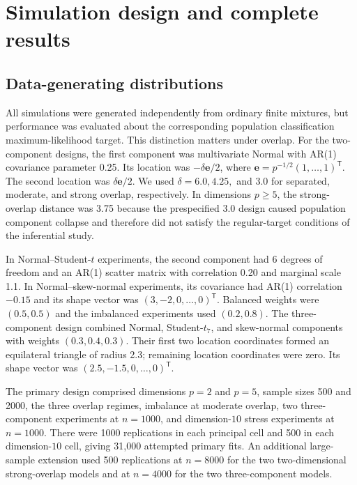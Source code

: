 \section{Simulation design and complete results}

\subsection{Data-generating distributions}

All simulations were generated independently from ordinary finite mixtures,
but performance was evaluated about the corresponding population
classification maximum-likelihood target.  This distinction matters under
overlap.  For the two-component designs, the first component was multivariate
Normal with AR(1) covariance parameter 0.25.  Its location was
$-\delta\mathbf{e}/2$, where
$\mathbf{e}=p^{-1/2}(1,\ldots,1)^\mathsf T$.  The second location was
$\delta\mathbf{e}/2$.  We used $\delta=6.0,4.25,$ and $3.0$ for separated,
moderate, and strong overlap, respectively.  In dimensions $p\geq5$, the
strong-overlap distance was 3.75 because the prespecified $3.0$ design caused
population component collapse and therefore did not satisfy the regular-target
conditions of the inferential study.

In Normal--Student-$t$ experiments, the second component had 6 degrees of
freedom and an AR(1) scatter matrix with correlation 0.20 and marginal scale
1.1.  In Normal--skew-normal experiments, its covariance had AR(1) correlation
$-0.15$ and its shape vector was
$(3,-2,0,\ldots,0)^\mathsf T$.  Balanced weights were $(0.5,0.5)$ and the
imbalanced experiments used $(0.2,0.8)$.  The three-component design combined
Normal, Student-$t_7$, and skew-normal components with weights
$(0.3,0.4,0.3)$.  Their first two location coordinates formed an equilateral
triangle of radius 2.3; remaining location coordinates were zero.  Its shape
vector was $(2.5,-1.5,0,\ldots,0)^\mathsf T$.

The primary design comprised dimensions $p=2$ and $p=5$, sample sizes 500 and
2000, the three overlap regimes, imbalance at moderate overlap, two
three-component experiments at $n=1000$, and dimension-$10$ stress experiments
at $n=1000$.  There were 1000 replications in each principal cell and 500 in
each dimension-$10$ cell, giving 31,000 attempted primary fits.  An additional
large-sample extension used 500 replications at $n=8000$ for the two
two-dimensional strong-overlap models and at $n=4000$ for the two
three-component models.

